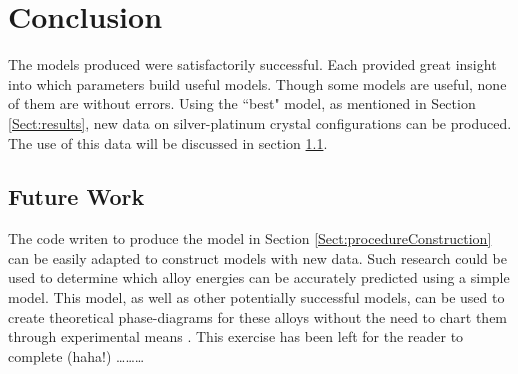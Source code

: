 \section{Conclusion}\label{Sect:conclusion}
\par The models produced were satisfactorily successful. Each provided great insight into which parameters build useful models. Though some models are useful, none of them are without errors. Using the ``best" model, as mentioned in Section \ref{Sect:results}, new data on silver-platinum crystal configurations can be produced. The use of this data will be discussed in section \ref{Sect:futureWork}.

\subsection{Future Work}\label{Sect:futureWork}
\par The code writen to produce the model in Section \ref{Sect:procedureConstruction} can be easily adapted to construct models with new data. Such research could be used to determine which alloy energies can be accurately predicted using a simple model. This model, as well as other potentially successful models, can be used to create theoretical phase-diagrams for these alloys without the need to chart them through experimental means \cite{solidStateBook}. This exercise has been left for the reader to complete (haha!) \ldots\ldots\ldots